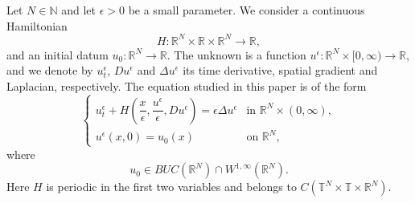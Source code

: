 \documentclass[preprint]{elsarticle}
\numberwithin{equation}{section}
\begin{document}
Let $N\in\mathbb N$ and let $\epsilon>0$ be a small parameter. We consider a continuous Hamiltonian
\begin{equation*}
H:\mathbb R^N\times\mathbb R\times\mathbb R^N\to\mathbb R,
\end{equation*}
and an initial datum $u_0:\mathbb R^N\to\mathbb R.$
The unknown is a function $u^\epsilon:\mathbb R^N\times[0,\infty)\to\mathbb R,$
and we denote by $u_t^\epsilon$, $Du^\epsilon$ and $\Delta u^\epsilon$ its time derivative, spatial gradient and Laplacian, respectively. The equation studied in this paper is of the form
\begin{equation}
\begin{cases}
u_t^\epsilon
+
H\left(
\dfrac{x}{\epsilon},
\dfrac{u^\epsilon}{\epsilon},
Du^\epsilon
\right)
=
\epsilon\Delta u^\epsilon
&\text{in }\mathbb R^N\times(0,\infty),
\\[2mm]
u^\epsilon(x,0)=u_0(x)
&\text{on }\mathbb R^N,
\end{cases}\label{HJ}
\end{equation}
where
\[
u_0\in BUC(\mathbb R^N)\cap W^{1,\infty}(\mathbb R^N).
\]
Here $H$ is periodic in the first two variables and belongs to $C(\mathbb T^N\times \mathbb T\times\mathbb R^N)$. 
\end{document}
